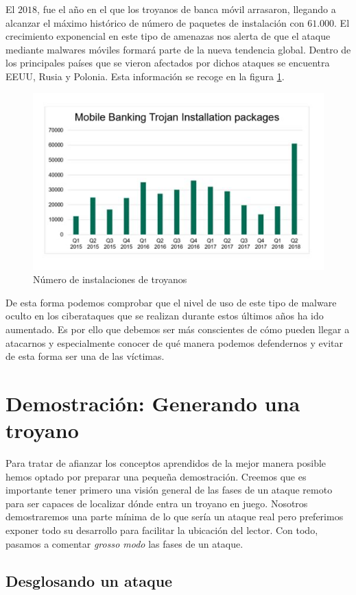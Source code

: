 \documentclass[12pt]{article}
\begin{document}
            El $2018$, fue el año en el que los troyanos de banca móvil arrasaron, llegando a alcanzar el máximo histórico de número de paquetes de instalación con $61.000$. El crecimiento exponencial en este tipo de amenazas nos alerta de que el ataque mediante malwares móviles formará parte de la nueva tendencia global. Dentro de los principales países que se vieron afectados por dichos ataques se encuentra EEUU, Rusia y Polonia. Esta información se recoge en la figura \ref{f:troj_installs}.

            \begin{figure}
                \centering
                \includegraphics[width=0.5\linewidth]{troj_installs.png}
                \caption{Número de instalaciones de troyanos}
                \label{f:troj_installs}
            \end{figure}


            De esta forma podemos comprobar que el nivel de uso de este tipo de malware oculto en los ciberataques que se realizan durante estos últimos años ha ido aumentado. Es por ello que debemos ser más conscientes de cómo pueden llegar a atacarnos y especialmente conocer de qué manera podemos defendernos y evitar de esta forma ser una de las víctimas.

    \section{Demostración: Generando una troyano}
        Para tratar de afianzar los conceptos aprendidos de la mejor manera posible hemos optado por preparar una pequeña demostración. Creemos que es importante tener primero una visión general de las fases de un ataque remoto para ser capaces de localizar dónde entra un troyano en juego. Nosotros demostraremos una parte mínima de lo que sería un ataque real pero preferimos exponer todo su desarrollo para facilitar la ubicación del lector. Con todo, pasamos a comentar \textit{grosso modo} las fases de un ataque.

        \subsection{Desglosando un ataque}
\end{document}
